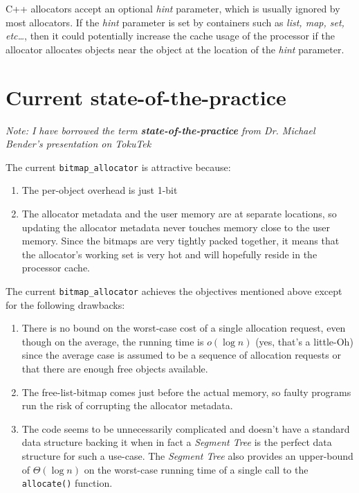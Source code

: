 \documentclass{article}
\begin{document}
C++ allocators accept an optional \textit{hint} parameter, which is
usually ignored by most allocators. If the \textit{hint} parameter is
set by containers such as \textit{list, map, set, etc\ldots{}}, then
it could potentially increase the cache usage of the processor if the
allocator allocates objects near the object at the location of the
\textit{hint} parameter.

\section{Current state-of-the-practice}

\textit{Note: I have borrowed the term \textbf{state-of-the-practice}
  from Dr. Michael Bender's presentation on TokuTek}

The current \texttt{bitmap\_allocator} is attractive because:

\begin{enumerate}

\item The per-object overhead is just 1-bit

\item The allocator metadata and the user memory are at separate
  locations, so updating the allocator metadata never touches memory
  close to the user memory. Since the bitmaps are very tightly packed
  together, it means that the allocator's working set is very hot and
  will hopefully reside in the processor cache.

\end{enumerate}

The current \texttt{bitmap\_allocator} achieves the objectives
mentioned above except for the following drawbacks:

\begin{enumerate}

\item There is no bound on the worst-case cost of a single allocation
  request, even though on the average, the running time is
  $o(\log{n})$ (yes, that's a little-Oh) since the average case is
  assumed to be a sequence of allocation requests or that there are
  enough free objects available.

\item The free-list-bitmap comes just before the actual memory, so
  faulty programs run the risk of corrupting the allocator metadata.

\item The code seems to be unnecessarily complicated and doesn't have
  a standard data structure backing it when in fact a \textit{Segment
    Tree} is the perfect data structure for such a use-case. The
  \textit{Segment Tree} also provides an upper-bound of $\Theta(\log{n})$
  on the worst-case running time of a single call to the
  \texttt{allocate()} function.

\end{enumerate}
\end{document}
